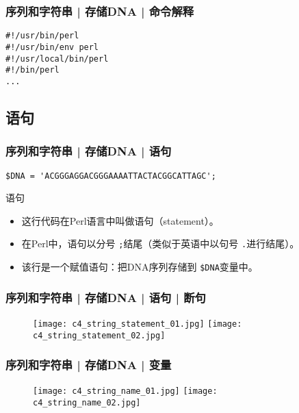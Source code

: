 \begin{frame}[fragile]
  \frametitle{序列和字符串 | 存储DNA | 命令解释}
  \vspace{-1.5em}
\begin{lstlisting}
#!/usr/bin/perl
#!/usr/bin/env perl
#!/usr/local/bin/perl
#!/bin/perl
...
\end{lstlisting}
\end{frame}

\subsection{语句}
\begin{frame}[fragile]
  \frametitle{序列和字符串 | 存储DNA | \alert{语句}}
  \vspace{-1.5em}
\begin{lstlisting}
$DNA = 'ACGGGAGGACGGGAAAATTACTACGGCATTAGC';
\end{lstlisting}
\pause
\begin{block}{语句}
  \begin{itemize}
    \item 这行代码在Perl语言中叫做语句（statement）。
    \item 在Perl中，语句以分号 \verb|;|结尾（类似于英语中以句号 \verb|.|进行结尾）。
    \item 该行是一个赋值语句：把DNA序列存储到 \verb|$DNA|变量中。
  \end{itemize}
\end{block}
\end{frame}

\begin{frame}
  \frametitle{序列和字符串 | 存储DNA | 语句 | 断句}
  \begin{figure}
    \centering
    \texttt{[image: c4\_string\_statement\_01.jpg]}
    \quad
    \texttt{[image: c4\_string\_statement\_02.jpg]}
  \end{figure}
\end{frame}

\begin{frame}
  \frametitle{序列和字符串 | 存储DNA | 变量}
  \begin{figure}
    \centering
    \texttt{[image: c4\_string\_name\_01.jpg]}
    \quad
    \texttt{[image: c4\_string\_name\_02.jpg]}
  \end{figure}
\end{frame}


